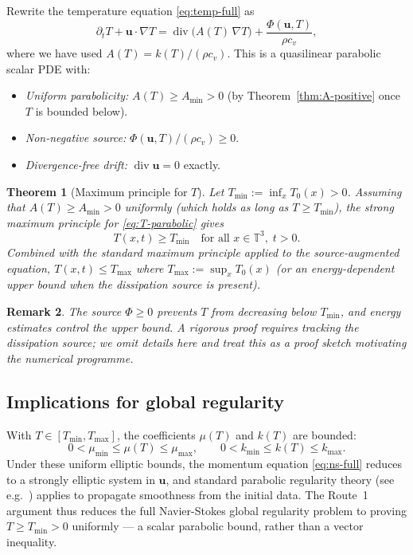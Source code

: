 \documentclass[12pt]{article}
\newtheorem{theorem}{Theorem}[section]
\newtheorem{remark}[theorem]{Remark}
\newcommand{\T}{\mathbb{T}}
\newcommand{\Div}{\operatorname{div}}
\newcommand{\p}{\partial}
\newcommand{\grad}{\nabla}
\newcommand{\Amin}{A_{\min}}
\begin{document}
Rewrite the temperature equation \eqref{eq:temp-full} as
\begin{equation}
  \label{eq:T-parabolic}
  \p_t T + \mathbf{u}\cdot\grad T = \Div\bigl(A(T)\,\grad T\bigr)
    + \frac{\Phi(\mathbf{u},T)}{\rho c_v},
\end{equation}
where we have used $A(T) = k(T)/(\rho c_v)$.  This is a quasilinear parabolic
scalar PDE with:
\begin{itemize}[leftmargin=2em]
  \item \emph{Uniform parabolicity:} $A(T) \geq \Amin > 0$ (by
    Theorem~\ref{thm:A-positive} once $T$ is bounded below).
  \item \emph{Non-negative source:} $\Phi(\mathbf{u},T)/(\rho c_v) \geq 0$.
  \item \emph{Divergence-free drift:} $\Div\mathbf{u} = 0$ exactly.
\end{itemize}

\begin{theorem}[Maximum principle for $T$]
  \label{thm:max-principle}
  Let $T_{\min} := \inf_{x} T_0(x) > 0$.  Assuming that
  $A(T) \geq \Amin > 0$ uniformly (which holds as long as $T \geq T_{\min}$),
  the strong maximum principle for \eqref{eq:T-parabolic} gives
  \[
    T(x,t) \geq T_{\min} \quad\text{for all } x\in\T^3,\; t > 0.
  \]
  Combined with the standard maximum principle applied to the source-augmented
  equation, $T(x,t) \leq T_{\max}$ where $T_{\max} := \sup_x T_0(x)$ (or an
  energy-dependent upper bound when the dissipation source is present).
\end{theorem}

\begin{remark}
  The source $\Phi \geq 0$ prevents $T$ from decreasing below $T_{\min}$, and
  energy estimates control the upper bound.  A rigorous proof requires tracking
  the dissipation source; we omit details here and treat this as a proof sketch
  motivating the numerical programme.
\end{remark}

\subsection{Implications for global regularity}
\label{ssec:regularity-sketch}

With $T \in [T_{\min}, T_{\max}]$, the coefficients $\mu(T)$ and $k(T)$ are
bounded:
\begin{equation}
  \label{eq:coeff-bounds}
  0 < \mu_{\min} \leq \mu(T) \leq \mu_{\max},
  \qquad
  0 < k_{\min} \leq k(T) \leq k_{\max}.
\end{equation}
Under these uniform elliptic bounds, the momentum equation \eqref{eq:ns-full}
reduces to a strongly elliptic system in $\mathbf{u}$, and standard parabolic
regularity theory (see e.g.\ \citealt{Prodi1959, Serrin1962}) applies to propagate
smoothness from the initial data.  The Route~1 argument thus reduces the full
Navier-Stokes global regularity problem to proving $T \geq T_{\min} > 0$
uniformly --- a scalar parabolic bound, rather than a vector inequality.
\end{document}
